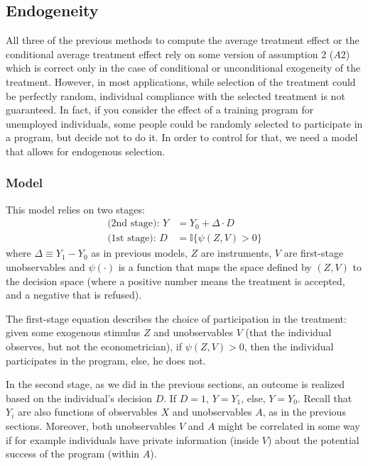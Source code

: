 \subsection{Endogeneity}

All three of the previous methods to compute the average treatment effect or the conditional average treatment effect rely on some version of assumption 2 ($A2$) which is correct only in the case of conditional or unconditional exogeneity of the treatment. However, in most applications, while selection of the treatment could be perfectly random, individual compliance with the selected treatment is not guaranteed. In fact, if you consider the effect of a training program for unemployed individuals, some people could be randomly selected to participate in a program, but decide not to do it. In order to control for that, we need a model that allows for endogenous selection.

\subsubsection{Model}

This model relies on two stages: \begin{align*}
\text{(2nd stage): } Y & = Y_0 + \Delta\cdot D \\
\text{(1st stage): } D & = \mathbb{I}\{\psi(Z, V) > 0\}
\end{align*}
where $\Delta \equiv Y_1 - Y_0$ as in previous models, $Z$ are instruments, $V$ are first-stage unobservables and $\psi(\cdot)$ is a function that maps the space defined by $(Z, V)$ to the decision space (where a positive number means the treatment is accepted, and a negative that is refused).

The first-stage equation describes the choice of participation in the treatment: given some exogenous stimulus $Z$ and unobservables $V$ (that the individual observes, but not the econometrician), if $\psi(Z,V)>0$, then the individual participates in the program, else, he does not.

In the second stage, as we did in the previous sections, an outcome is realized based on the individual's decision $D$. If $D=1$, $Y = Y_1$, else, $Y = Y_0$. Recall that $Y_i$ are also functions of observables $X$ and unobservables $A$, as in the previous sections. Moreover, both unobservables $V$ and $A$ might be correlated in some way if for example individuals have private information (inside $V$) about the potential success of the program (within $A$).

